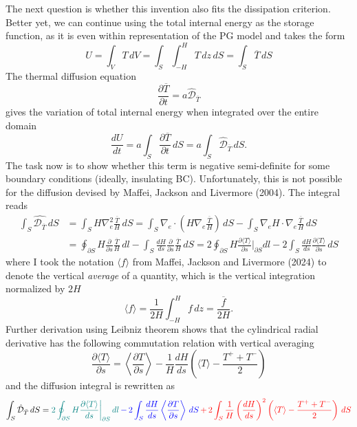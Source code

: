 The next question is whether this invention also fits the dissipation criterion. 
Better yet, we can continue using the total internal energy as the storage function, as it is even within representation of the PG model and takes the form
\begin{equation}
    U = \int_V T \, dV = \int_S \int_{-H}^H T \, dz \, dS = \int_S \overline{T} \, dS
\end{equation}
The thermal diffusion equation
\[
    \frac{\partial \overline{T}}{\partial t} = a \hat{\mathcal{D}}_{\overline{T}}
\]
gives the variation of total internal energy when integrated over the entire domain
\[
    \frac{dU}{dt} = a \int_S \frac{\partial \overline{T}}{\partial t} \, dS = a \int_S \hat{\mathcal{D}}_{\overline{T}} \, dS.
\]
The task now is to show whether this term is negative semi-definite for some boundary conditions (ideally, insulating BC). Unfortunately, this is not possible for the diffusion devised by Maffei, Jackson and Livermore (2004). The integral reads
\[\begin{aligned}
    \int_S \hat{\mathcal{D}_{\overline{T}}} \, dS &= \int_S H \nabla_e^2 \frac{\overline{T}}{H} \, dS = \int_S \nabla_e \cdot \left(H \nabla_e \frac{\overline{T}}{H}\right) \, dS - \int_S \nabla_e H \cdot \nabla_e \frac{\overline{T}}{H} \, dS \\ 
    &= \oint_{\partial S} H \frac{\partial}{\partial s} \frac{\overline{T}}{H} \, dl - \int_{S} \frac{dH}{ds} \frac{\partial}{\partial s} \frac{\overline{T}}{H} \, dS 
    = 2\oint_{\partial S} H \frac{\partial \langle T \rangle}{\partial s} \bigg|_{\partial S} dl - 2\int_{S} \frac{dH}{ds} \frac{\partial \langle T \rangle}{\partial s} \, dS
\end{aligned}\]
where I took the notation $\langle f \rangle$ from Maffei, Jackson and Livermore (2024) to denote the vertical \textit{average} of a quantity, which is the vertical integration normalized by $2H$
\[
    \langle f \rangle = \frac{1}{2H} \int_{-H}^H f \, dz = \frac{\overline{f}}{2H}.
\]
Further derivation using Leibniz theorem shows that the cylindrical radial derivative has the following commutation relation with vertical averaging
\[
    \frac{\partial \langle T \rangle}{\partial s} = \left\langle \frac{\partial T}{\partial s} \right\rangle - \frac{1}{H} \frac{dH}{ds} \left(\langle T \rangle - \frac{T^+ + T^-}{2}\right)
\]
and the diffusion integral is rewritten as 
\begin{equation}
    \int_S \hat{\mathcal{D}}_{\bar{T}} \, dS = 
    \textcolor{teal}{2 \oint_{\partial S} H \frac{\partial \langle T \rangle}{ds} \bigg|_{\partial S} \, dl} 
    \textcolor{blue}{\,-\, 2 \int_S \frac{dH}{ds} \left\langle \frac{\partial T}{\partial s} \right\rangle \, dS} 
    \textcolor{red}{\,+\, 2 \int_S \frac{1}{H} \left(\frac{dH}{ds}\right)^2 \left(\langle T \rangle - \frac{T^+ + T^-}{2}\right) \, dS}
\end{equation}
